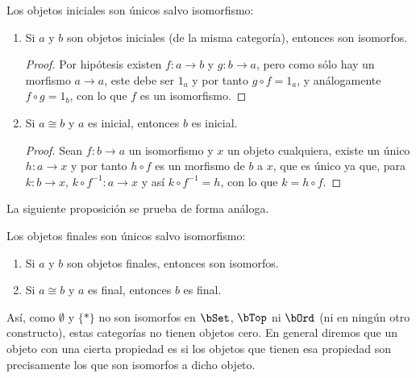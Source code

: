\begin{proposition}
  Los objetos iniciales son únicos salvo isomorfismo:
  \begin{enumerate}
  \item Si $a$ y $b$ son objetos iniciales (de la misma categoría), entonces son
    isomorfos.
    \begin{proof}
      Por hipótesis existen $f:a\to b$ y $g:b\to a$, pero como sólo hay un morfismo
      $a\to a$, este debe ser $1_a$ y por tanto $g\circ f=1_a$, y análogamente
      $f\circ g=1_b$, con lo que $f$ es un isomorfismo.
    \end{proof}
  \item Si $a\cong b$ y $a$ es inicial, entonces $b$ es inicial.
    \begin{proof}
      Sean $f:b\to a$ un isomorfismo y $x$ un objeto cualquiera, existe un único
      $h:a\to x$ y por tanto $h\circ f$ es un morfismo de $b$ a $x$, que es
      único ya que, para $k:b\to x$, $k\circ f^{-1}:a\to x$ y así
      $k\circ f^{-1}=h$, con lo que $k=h\circ f$.
    \end{proof}
  \end{enumerate}
\end{proposition}

La siguiente proposición se prueba de forma análoga.

\begin{proposition}
  Los objetos finales son únicos salvo isomorfismo:
  \begin{enumerate}
  \item Si $a$ y $b$ son objetos finales, entonces son isomorfos.
  \item Si $a\cong b$ y $a$ es final, entonces $b$ es final.
  \end{enumerate}
\end{proposition}

Así, como $\emptyset$ y $\{*\}$ no son isomorfos en $\bSet$, $\bTop$ ni $\bOrd$
(ni en ningún otro constructo), estas categorías no tienen objetos cero.  En
general diremos que un objeto con una cierta propiedad es  si los objetos que tienen esa propiedad son precisamente los que
son isomorfos a dicho objeto.

